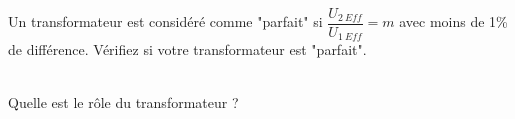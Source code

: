 \documentclass[11pt,a4paper]{article}
\newcommand{\cadreblanc}[1]{%
\medskip\framebox[\linewidth][c]{%
\rule{0mm}{#1mm}}\par
\medskip}
\begin{document}
\vfill 
{}  \\

Un transformateur est considéré comme "parfait" si $\dfrac{U_{2~Eff}}{U_{1~Eff}} = m $ avec moins de 1\% de différence. Vérifiez si votre transformateur est "parfait".

\cadreblanc{25}

\vfill 

  \\[2mm]

Quelle est le rôle du transformateur ? 

\cadreblanc{20}


\vfill 
\end{document}

